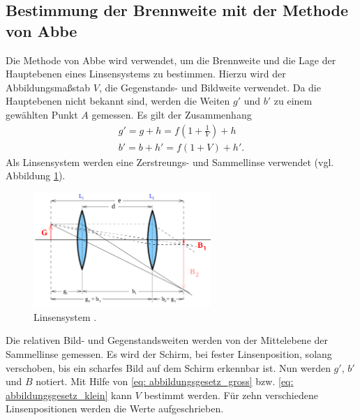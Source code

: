 \subsection{Bestimmung der Brennweite mit der Methode von Abbe}
Die Methode von Abbe wird verwendet, um die Brennweite und die Lage der Hauptebenen
eines Linsensystems zu bestimmen. Hierzu wird der Abbildungsmaßstab $V$,
die Gegenstands- und Bildweite verwendet. Da die Hauptebenen nicht bekannt sind,
werden die Weiten $g'$ und $b'$ zu einem gewählten Punkt $A$ gemessen.
Es gilt der Zusammenhang
\begin{align}
    g'=g+h=f\left(1+\frac{1}{V}\right)+h \label{eq: abstaende_abbe_g} \\
    b'=b+h'=f\left(1+V\right)+h' \label{eq: abstaende_abbe_b}.
\end{align}
Als Linsensystem werden eine Zerstreungs- und Sammellinse verwendet (vgl. Abbildung \ref{fig: linsensystem}). %
\begin{figure}
    \centering
    \includegraphics[width=0.6\textwidth]{./pics/linsensystem.png}
    \caption{Linsensystem \cite{anleitung408}.}
    \label{fig: linsensystem}
\end{figure}
Die relativen Bild- und Gegenstandsweiten werden von der Mittelebene
der Sammellinse gemessen.
Es wird der Schirm, bei fester Linsenposition, solang verschoben, bis ein scharfes
Bild auf dem Schirm erkennbar ist. Nun werden $g'$, $b'$ und $B$ notiert.
Mit Hilfe von \eqref{eq: abbildungsgesetz_gross} bzw. \eqref{eq: abbildungsgesetz_klein}
kann $V$ bestimmt werden.
Für zehn verschiedene Linsenpositionen werden die Werte aufgeschrieben. %
